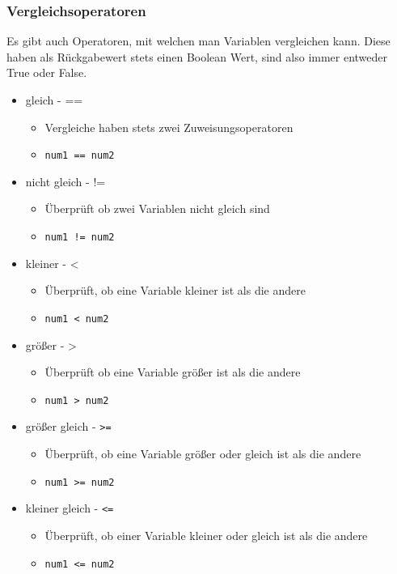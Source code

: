 \documentclass{article}
\begin{document}
	\subsubsection{Vergleichsoperatoren}
	Es gibt auch Operatoren, mit welchen man Variablen vergleichen kann. Diese haben als Rückgabewert stets einen Boolean Wert, sind also immer entweder True oder False.
	\begin{itemize}
		\item{gleich - ==}
		\begin{itemize}
			\item{Vergleiche haben stets zwei Zuweisungsoperatoren}
			\item{\verb|num1 == num2|}
		\end{itemize}
		\item{nicht gleich - !=}
		\begin{itemize}
			\item{Überprüft ob zwei Variablen nicht gleich sind}
			\item{\verb|num1 != num2|}
		\end{itemize}
		\item{kleiner - <}
		\begin{itemize}
			\item{Überprüft, ob eine Variable kleiner ist als die andere}
			\item{\verb|num1 < num2|}
		\end{itemize}
		\item{größer - >}
		\begin{itemize}
			\item{Überprüft ob eine Variable größer ist als die andere}
			\item{\verb|num1 > num2|}
		\end{itemize}
		\item{größer gleich - \verb|>=|}
		\begin{itemize}
			\item{Überprüft, ob eine Variable größer oder gleich ist als die andere}
			\item{\verb|num1 >= num2|}
		\end{itemize}
		\item{kleiner gleich - \verb|<=|}
		\begin{itemize}
			\item{Überprüft, ob einer Variable kleiner oder gleich ist als die andere}
			\item{\verb|num1 <= num2|}
		\end{itemize}
	\end{itemize}
\end{document}
